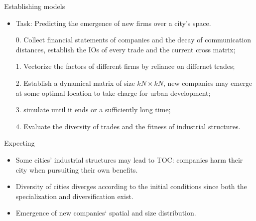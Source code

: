 \documentclass{beamer}
\begin{document}
\begin{frame}{Establishing models}
    \begin{itemize}
        \item Task: Predicting the emergence of new firms over a city's space.
        \item[0.] Collect financial statements of companies and the decay of communication distances, establish the IOs of every trade and the current cross matrix;
        \item[1.] Vectorize the factors of different firms by reliance on differnet trades;
        \item[2.] Establish a dynamical matrix of size $kN\times kN$, new companies may emerge at some optimal location to take charge for urban development;
        \item[3.] simulate until it ends or a sufficiently long time;
        \item[4.] Evaluate the diversity of trades and the fitness of industrial structures.
    \end{itemize}
\end{frame}

\begin{frame}{Expecting}
    \begin{itemize}
        \item Some cities' industrial structures may lead to TOC: companies harm their city when pursuiting their own benefits.
        \item Diversity of cities diverges according to the initial conditions since both the specialization and diversification exist.
        \item Emergence of new companies‘ spatial and size distribution.
    \end{itemize}
\end{frame}
\end{document}

